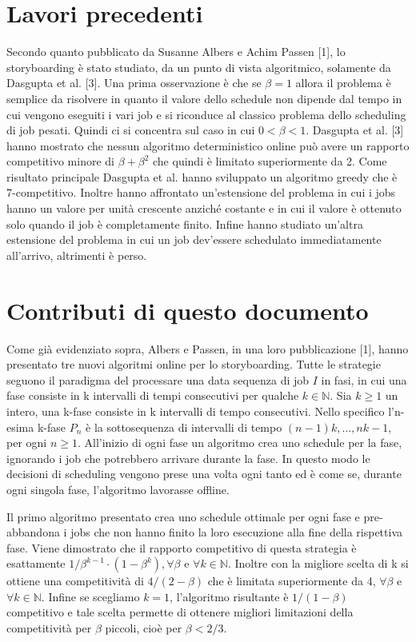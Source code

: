 \documentclass[twoside,openany,titlepage,fleqn,
	headinclude,12pt,a4paper,BCOR5mm,footinclude]{scrbook}
\newcommand*{\N}{\mathbb{N}}
\begin{document}
\chapter{Lavori precedenti}
Secondo quanto pubblicato da Susanne Albers e Achim Passen [1], lo storyboarding è stato studiato, da un punto di vista algoritmico, solamente da Dasgupta et al. [3]. Una prima osservazione è che se $\beta  = 1$ allora il problema è semplice da risolvere in quanto il valore dello schedule non dipende dal tempo in cui vengono eseguiti i vari job e si riconduce al classico problema dello scheduling di job pesati. Quindi ci si concentra sul caso in cui $0 < \beta < 1$.
Dasgupta et al. [3] hanno mostrato che nessun algoritmo deterministico online può avere un rapporto competitivo minore di $\beta + \beta^{2}$ che quindi è limitato superiormente da 2. Come risultato principale Dasgupta et al. hanno sviluppato un algoritmo greedy che è 7-competitivo. Inoltre hanno affrontato un’estensione del problema in cui i jobs hanno un valore per unità crescente anziché costante e in cui il valore è ottenuto solo quando il job è completamente finito. Infine hanno studiato un’altra estensione del problema in cui un job dev’essere schedulato immediatamente all’arrivo, altrimenti è perso.

\chapter{Contributi di questo documento}
Come già evidenziato sopra, Albers e Passen, in una loro pubblicazione [1], hanno presentato tre nuovi algoritmi online per lo storyboarding. Tutte le strategie seguono il paradigma del processare una data sequenza di job $I$ in fasi, in cui una fase consiste in k intervalli di tempi consecutivi per qualche $k\in \N$. 
Sia $k \geq 1$ un intero, una k-fase consiste in k intervalli di tempo consecutivi. Nello specifico l’n-esima k-fase $P_{n}$ è la sottosequenza di intervalli di tempo $(n-1)k,…,nk - 1$, per ogni $n \geq 1$. All’inizio di ogni fase un algoritmo crea uno schedule per la fase, ignorando i job che potrebbero arrivare durante la fase. In questo modo le decisioni di scheduling vengono prese una volta ogni tanto ed è come se, durante ogni singola fase, l'algoritmo lavorasse offline.

Il primo algoritmo presentato crea uno schedule ottimale per ogni fase e pre-abbandona i jobs che non hanno finito la loro esecuzione alla fine della rispettiva fase. Viene dimostrato che il rapporto competitivo di questa strategia è esattamente $1/\beta^{k-1}\cdot(1-\beta^{k}), \forall \beta$ e $\forall k \in \N$. Inoltre con la migliore scelta di k si ottiene una competitività di $4/(2 - \beta)$ che è limitata superiormente da 4, $\forall \beta$ e $\forall k \in \N$. Infine se scegliamo $k = 1$, l’algoritmo risultante è $1/(1-\beta)$ competitivo e tale scelta permette di ottenere migliori limitazioni della competitività per $\beta$ piccoli, cioè per $\beta < 2/3$.
\end{document}
